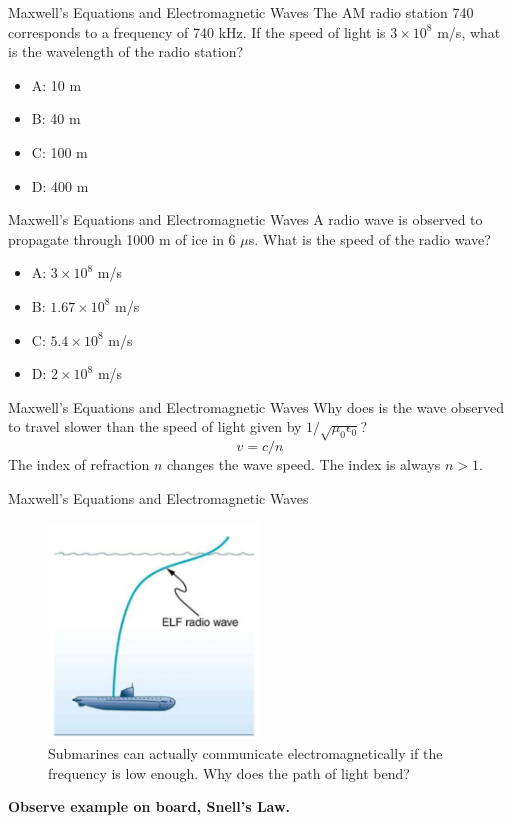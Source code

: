 \documentclass{beamer}
\begin{document}
\begin{frame}{Maxwell's Equations and Electromagnetic Waves}
The AM radio station 740 corresponds to a frequency of 740 kHz.  If the speed of light is $3 \times 10^{8}$ m/s, what is the wavelength of the radio station?
\begin{itemize}
\item A: 10 m
\item B: 40 m
\item C: 100 m
\item D: 400 m
\end{itemize}
\end{frame}

\begin{frame}{Maxwell's Equations and Electromagnetic Waves}
A radio wave is observed to propagate through 1000 m of ice in 6 $\mu$s.  What is the speed of the radio wave?
\begin{itemize}
\item A: $3 \times 10^8$ m/s
\item B: $1.67 \times 10^8$ m/s
\item C: $5.4 \times 10^8$ m/s
\item D: $2 \times 10^8$ m/s
\end{itemize}
\end{frame}

\begin{frame}{Maxwell's Equations and Electromagnetic Waves}
Why does is the wave observed to travel slower than the speed of light given by $1/\sqrt{\mu_0 \epsilon_0}$? \\ \vspace{0.5cm}
\begin{equation}
v = c/n
\end{equation}
The index of refraction $n$ changes the wave speed.  The index is always $n > 1$.
\end{frame}

\begin{frame}{Maxwell's Equations and Electromagnetic Waves}
\begin{figure}
\centering
\includegraphics[width=0.5\textwidth]{figures/sub.png}
\caption{\label{fig:sub} Submarines can actually communicate electromagnetically if the frequency is low enough.  Why does the path of light bend?}
\end{figure}
\textbf{Observe example on board, Snell's Law.}
\end{frame}
\end{document}
